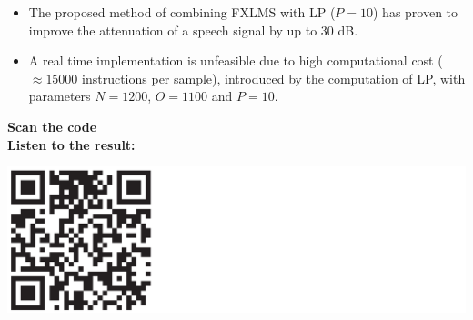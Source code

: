 \large
\begin{itemize}
	\item The proposed method of combining FXLMS with LP ($P=10$) has proven to improve the attenuation of a speech signal by up to 30 dB. \\
	\item A real time implementation is unfeasible due to high computational cost ($\approx15000$ instructions per sample), introduced by the computation of LP, with parameters $N=1200$, $O=1100$ and $P=10$. \\
\end{itemize}
\vspace{-5mm}
 \begin{minipage}{.8\columnwidth}
 	\begin{center}
	 	\textbf {\Large {\textcolor{aaublue1}{Scan the code}}}\\
	 	\textbf{\textcolor{aaublue1}{Listen to the result:}}
 	\end{center}
 \end{minipage}%
 \begin{minipage}{0.2\columnwidth}
 	\includegraphics[width=2.5\textwidth]{figures/QRCODE.pdf}
 \end{minipage}